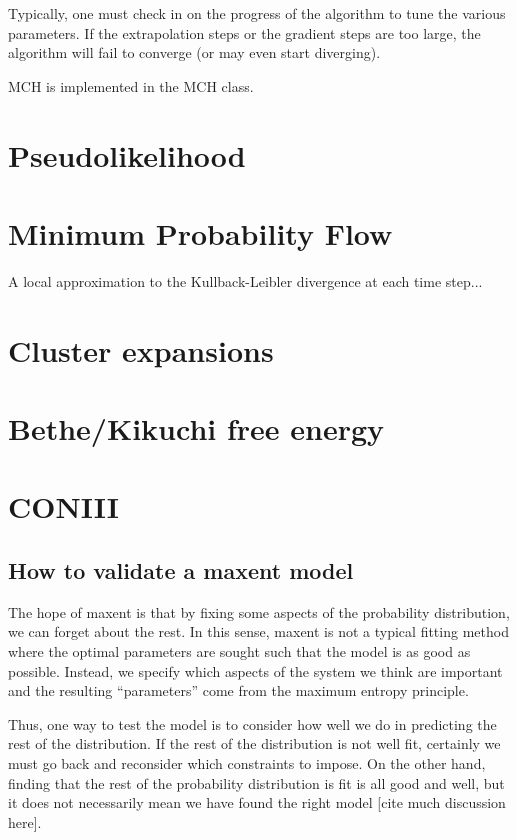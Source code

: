 \documentclass[aps,prl,twocolumn]{revtex4-1}
\begin{document}
Typically, one must check in on the progress of the algorithm to tune the various parameters. If the extrapolation steps or the gradient steps are too large, the algorithm will fail to converge (or may even start diverging).

MCH is implemented in the MCH class.

\section{Pseudolikelihood}

\section{Minimum Probability Flow}
A local approximation to the Kullback-Leibler divergence at each time step...
\cite{SohlDickstein:2011im}

\section{Cluster expansions}

\section{Bethe/Kikuchi free energy}

\section{CONIII}

\subsection{How to validate a maxent model}
The hope of maxent is that by fixing some aspects of the probability distribution, we can forget about the rest. In this sense, maxent is not a typical fitting method where the optimal parameters are sought such that the model is as good as possible. Instead, we specify which aspects of the system we think are important and the resulting ``parameters'' come from the maximum entropy principle.

Thus, one way to test the model is to consider how well we do in predicting the rest of the distribution. If the rest of the distribution is not well fit, certainly we must go back and reconsider which constraints to impose. On the other hand, finding that the rest of the probability distribution is fit is all good and well, but it does not necessarily mean we have found the right model [cite much discussion here].
\end{document}
